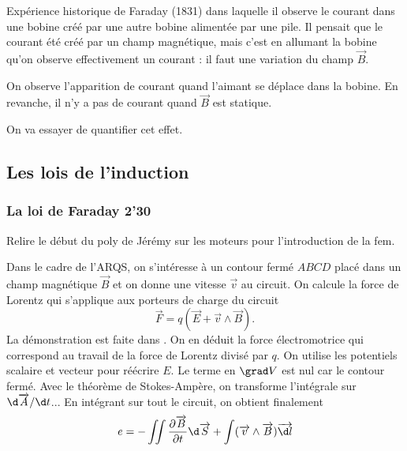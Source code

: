 \begin{slide}
Expérience historique de Faraday (1831) dans laquelle il observe le courant dans une bobine créé par une autre bobine alimentée par une pile.
Il pensait que le courant été créé par un champ magnétique, mais c'est en allumant la bobine qu'on observe effectivement un courant : il faut une variation du champ $\overrightarrow{B}$.
\end{slide}

\begin{experience}
On observe l'apparition de courant quand l'aimant se déplace dans la bobine. En revanche, il n'y a pas de courant quand $\overrightarrow{B}$ est statique.
\end{experience}

\begin{transition}
On va essayer de quantifier cet effet.
\end{transition}

\subsection{Les lois de l'induction}

\subsubsection{La loi de Faraday 2'30}

Relire le début du poly de Jérémy sur les moteurs pour l'introduction de la fem.

Dans le cadre de l'ARQS, on s'intéresse à un contour fermé $ABCD$ placé dans un champ magnétique $\overrightarrow{B}$ et on donne une vitesse $\overrightarrow{v}$ au circuit.
On calcule la force de Lorentz qui s'applique aux porteurs de charge du circuit
\begin{equation}
\overrightarrow{F} = q(\overrightarrow{E} + \overrightarrow{v}\wedge\overrightarrow{B}).
\end{equation}
La démonstration est faite dans \cite{Perez2009}.
On en déduit la force électromotrice qui correspond au travail de la force de Lorentz divisé par $q$.
On utilise les potentiels scalaire et vecteur pour réécrire $E$.
Le terme en $\grad V$ est nul car le contour fermé.
Avec le théorème de Stokes-Ampère, on transforme l'intégrale sur $\d\overrightarrow{A}/\d t$...
En intégrant sur tout le circuit, on obtient finalement
\begin{equation}
e=-\iint \frac{\partial\overrightarrow{B}}{\partial t}\d \overrightarrow{S} + \int (\overrightarrow{v}\wedge\overrightarrow{B})\overrightarrow{\d l}
\end{equation}

